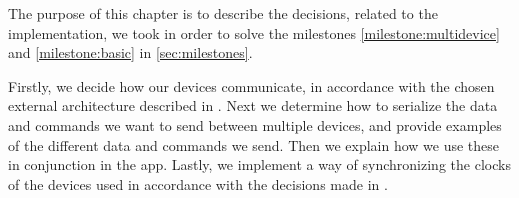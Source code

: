 The purpose of this chapter is to describe the decisions, related to the implementation, 
we took in order to solve the milestones \ref{milestone:multidevice} and \ref{milestone:basic} in \cref{sec:milestones}.

Firstly, we decide how our devices communicate, in accordance with the chosen external architecture described in .
Next we determine how to serialize the data and commands we want to send between multiple devices, and provide examples of the different data and commands we send.
Then we explain how we use these in conjunction in the app. 
Lastly, we implement a way of synchronizing the clocks of the devices used in accordance with the decisions made in .
